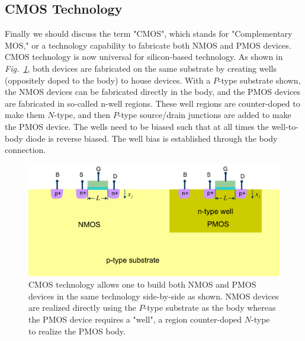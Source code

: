 \subsection{CMOS Technology}
Finally we should discuss the term "CMOS", which stands for "Complementary MOS," or a technology capability to fabricate both NMOS and PMOS devices.  CMOS technology is now universal for silicon-based technology.  As shown in \emph{Fig.~\ref{fig:cmos_xsect}}, both devices are fabricated on the same substrate by creating wells (oppositely doped to the body) to house devices.  With a $P$-type substrate shown, the NMOS devices can be fabricated directly in the body, and the PMOS devices are fabricated in so-called n-well regions.  These well regions are counter-doped to make them $N$-type, and then $P$-type source/drain junctions are added to make the PMOS device.  The wells need to be biased such that at all times the well-to-body diode is reverse biased.  The well bias is established through the body connection.
\begin{figure}[tb]
\centering
\includegraphics[width=.85\columnwidth]{cmos_xsect}
\caption{CMOS technology allows one to build both NMOS and PMOS devices in the same technology side-by-side as shown.  NMOS devices are realized directly using the $P$-type substrate as the body whereas the PMOS device requires a "well", a region counter-doped $N$-type to realize the PMOS body.}
\label{fig:cmos_xsect}
\end{figure}
